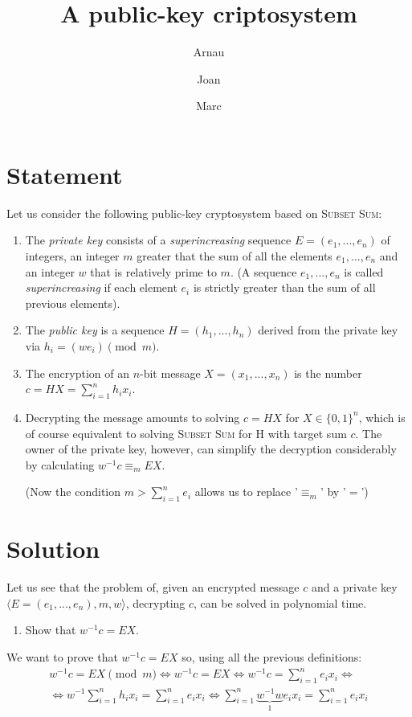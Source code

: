 \documentclass[a4paper]{article}
\title{A public-key criptosystem}
\author{Arnau \and Joan \and Marc}
\begin{document}
\maketitle
\section*{Statement}
Let us consider the following public-key cryptosystem based on \textsc{Subset Sum}:

\begin{enumerate}[label=\alph*)]
	\item The \emph{private key} consists of a \emph{superincreasing} sequence $E = (e_1, ..., e_n)$ of integers, an integer $m$ greater that the sum of all the elements $e_1, ..., e_n$ and an integer $w$ that is relatively prime to $m$. (A sequence $e_1, ..., e_n$ is called \emph{superincreasing} if each element $e_i$ is strictly greater than the sum of all previous elements).
	\item The \emph{public key} is a sequence $H = (h_1, ..., h_n)$ derived from the private key via $h_i = (we_i) \pmod{m}$.
	\item The encryption of an $n$-bit message $X = (x_1, ..., x_n)$ is the number $c = HX = \sum_{i=1}^n h_ix_i$.
	\item Decrypting the message amounts to solving $c = HX$ for $X \in \{0, 1\}^n$, which is of course equivalent to solving \textsc{Subset Sum} for H with target sum $c$. The owner of the private key, however, can simplify the decryption considerably by calculating $w^{-1}c \equiv_m EX$.
	
	(Now the condition $m > \sum_{i=1}^n e_i$ allows us to replace '$\equiv_m$' by '$=$')
\end{enumerate}

\section*{Solution}
Let us see that the problem of, given an encrypted message $c$ and a private key $\langle E = (e_1, ..., e_n), m, w \rangle$, decrypting $c$, can be solved in polynomial time.
\begin{enumerate}[label=\roman*)]
	\item Show that $w^{-1}c = EX$.
\end{enumerate}
We want to prove that $w^{-1}c = EX$ so, using all the previous definitions:
\begin{gather*}
	w^{-1}c = EX \pmod{m} \iff w^{-1}c = EX \iff w^{-1}c = \sum_{i=1}^{n} e_i x_i \iff \\
	\iff w^{-1} \sum_{i=1}^n h_i x_i = \sum_{i=1}^n e_i x_i \iff \sum_{i=1}^n \underbrace{w^{-1}w}_1 e_i x_i = \sum_{i=1}^n e_i x_i
\end{gather*}
\end{document}
